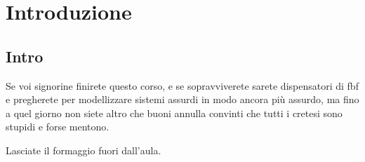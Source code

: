 
\chapter{Introduzione}

\label{cap:introduction}


\section{Intro}

Se voi signorine finirete questo corso, e se sopravviverete sarete
dispensatori di fbf e pregherete per modellizzare sistemi assurdi
in modo ancora più assurdo, ma fino a quel giorno non siete altro
che buoni annulla convinti che tutti i cretesi sono stupidi e forse
mentono.

Lasciate il formaggio fuori dall'aula. 
